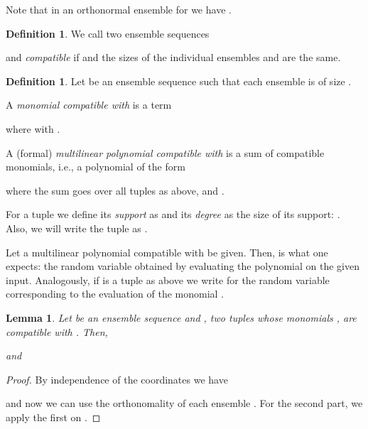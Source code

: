 \documentclass{daj}
\newcommand{\1}{\mathbbm{1}}
\theoremstyle{plain}
\newtheorem{lemma}[theorem]{Lemma}
\theoremstyle{definition}
\newtheorem{definition}[theorem]{Definition}
\begin{document}
Note that in an orthonormal ensemble for  we have .

\begin{definition}
We call two ensemble sequences 

and 
\emph{compatible} if  and the sizes of the individual ensembles
 and  are the same.
\end{definition}

\begin{definition}
Let 
be an ensemble sequence such that each ensemble  is of size .

A \emph{monomial compatible with } is a term

where  with 
.

A (formal) \emph{multilinear polynomial
compatible with } is
a sum of compatible monomials, i.e., a polynomial  of the form

where the sum goes over all tuples  
as above, and  .

For a tuple  we define its \emph{support}
as 
and its
 \emph{degree} as the size of its support:
.
Also, we will write the tuple  as .
\end{definition}

Let a multilinear polynomial  compatible with 
be given. Then,  is what one expects:
the random variable obtained by evaluating the polynomial on the given input.
Analogously, if  is a tuple as above we write  for 
the random variable corresponding to the evaluation of the monomial .

\begin{lemma}\label{lem:orthonormality}
Let  be an ensemble sequence and ,  
two tuples whose monomials ,  are compatible with 
.
Then, 

and

\end{lemma}
\begin{proof}
By independence of the coordinates we have

and now we can use the orthonomality of each ensemble .
For the second part, we apply the first on .
\end{proof}
\end{document}
